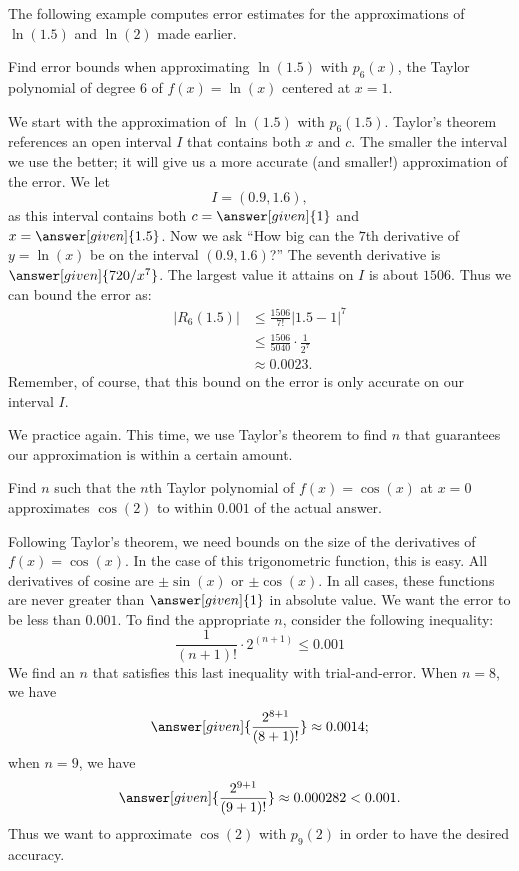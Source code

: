 \documentclass{ximera}
\begin{document}
The following example computes error estimates for the approximations
of $\ln(1.5)$ and $\ln(2)$ made earlier.

\begin{example}
Find error bounds when approximating $\ln(1.5)$ with $p_6(x)$, the
Taylor polynomial of degree $6$ of $f(x)=\ln(x)$ centered at $x=1$.
\begin{explanation}
We start with the approximation of $\ln(1.5)$ with $p_6(1.5)$. Taylor's
theorem references an open interval $I$ that contains both $x$ and
$c$. The smaller the interval we use the better; it will give us a
more accurate (and smaller!) approximation of the error. We let
\[
I =(0.9,1.6),
\]
as this interval contains both $c=\answer[given]{1}$ and
$x=\answer[given]{1.5}$.  Now we ask ``How big can the $7$th
derivative of $y=\ln(x)$ be on the interval $(0.9,1.6)$?'' The seventh
derivative is $\answer[given]{720/x^7}$. The largest value it attains on $I$ is about
$1506$. Thus we can bound the error as:
\begin{align*}
|R_6(1.5)| &\leq \frac{1506}{7!}|1.5-1|^7\\
&\leq \frac{1506}{5040}\cdot\frac1{2^7}\\
&\approx 0.0023.
\end{align*}
Remember, of course, that this bound on the error is only accurate on our 
interval $I$.
\end{explanation}
\end{example}

  
We practice again. This time, we use Taylor's theorem to find $n$ that
guarantees our approximation is within a certain amount.

\begin{example}
  Find $n$ such that the $n$th Taylor polynomial of $f(x)=\cos(x)$ at
  $x=0$ approximates $\cos(2)$ to within $0.001$ of the actual
  answer.
\begin{explanation}
  Following Taylor's theorem, we need bounds on the size of the
  derivatives of $f(x)=\cos(x)$. In the case of this trigonometric
  function, this is easy. All derivatives of cosine are $\pm \sin(x)$
  or $\pm \cos(x)$. In all cases, these functions are never greater
  than $\answer[given]{1}$ in absolute value. We want the error to be
  less than $0.001$. To find the appropriate $n$, consider the
  following inequality:
  \[
  \frac{1}{(n+1)!}\cdot2^{(n+1)} \leq 0.001
  \]
We find an $n$ that satisfies this last inequality with trial-and-error. When $n=8$, we have
\[
\answer[given]{\frac{2^{8+1}}{(8+1)!}} \approx 0.0014;
\]
when $n=9$, we have
\[
\answer[given]{\frac{2^{9+1}}{(9+1)!}} \approx 0.000282 <0.001.
\]
Thus we want to approximate $\cos(2)$ with $p_9(2)$ in order to have 
the desired accuracy.
\end{explanation}
\end{example}
\end{document}
